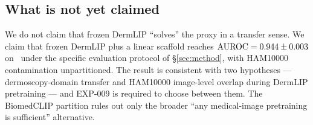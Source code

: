 \subsection{What is not yet claimed}
\label{sec:analysis:non-claim}

We do not claim that frozen DermLIP ``solves'' the proxy in a transfer
sense. We claim that frozen DermLIP plus a linear scaffold reaches
$\mathrm{AUROC} = 0.944 \pm 0.003$ on \strongholdtwo\ under the specific evaluation
protocol of \S\ref{sec:method}, with HAM10000 contamination unpartitioned.
The result is consistent with two hypotheses --- dermoscopy-domain transfer
and HAM10000 image-level overlap during DermLIP pretraining --- and EXP-009
is required to choose between them. The BiomedCLIP partition rules out only
the broader ``any medical-image pretraining is sufficient'' alternative.
